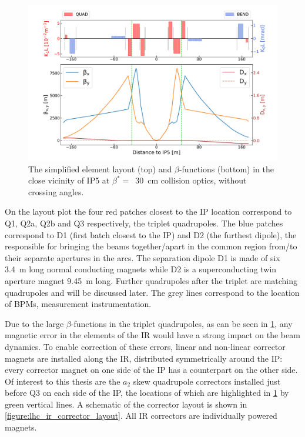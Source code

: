 \begin{figure}[!hbt]
  \centering
  \includegraphics*[width=\linewidth]{Figures/Optics_Measurements_Corrections_at_LHC/lhc_ir5_zoomed.pdf}
  \caption{The simplified element layout (top) and \(\beta\)-functions (bottom) in the close vicinity of IP\num{5} at \(\beta^{\ast} =\)~\qty{30}{\centi\metre} collision optics, without crossing angles.}
  \label{figure:lhc_ir5_zoomed}
\end{figure}

On the layout plot the four \textcolor{latwiss_red}{red patches} closest to the \gls{IP} location correspond to Q\num{1}, Q\num{2}a, Q\num{2}b and Q\num{3} respectively, the triplet quadrupoles.
The \textcolor{latwiss_blue}{blue patches} correspond to D\num{1} (first batch closest to the IP) and D\num{2} (the furthest dipole), the  responsible for bringing the beams together/apart in the common region from/to their separate apertures in the arcs.
The separation dipole D\num{1} is made of six \qty{3.4}{\meter} long normal conducting magnets while D\num{2} is a superconducting twin aperture magnet \qty{9.45}{\meter} long.
Further quadrupoles after the triplet are matching quadrupoles and will be discussed later.
The grey lines correspond to the location of \glspl{BPM}, measurement instrumentation.
\break

Due to the large \(\beta\)-functions in the triplet quadrupoles, as can be seen in \cref{figure:lhc_ir5_zoomed}, any magnetic error in the elements of the IR would have a strong impact on the beam dynamics.
To enable correction of these errors, linear and non-linear corrector magnets are installed along the IR, distributed symmetrically around the IP: every corrector magnet on one side of the IP has a counterpart on the other side.
Of interest to this thesis are the \(a_2\) \gls{skew} quadrupole correctors installed just before Q\num{3} on each side of the \gls{IP}, the locations of which are highlighted in \cref{figure:lhc_ir5_zoomed} by \textcolor{mqsx_green}{green vertical lines}.
A schematic of the corrector layout is shown in \cref{figure:lhc_ir_corrector_layout}.
All IR correctors are individually powered magnets.

